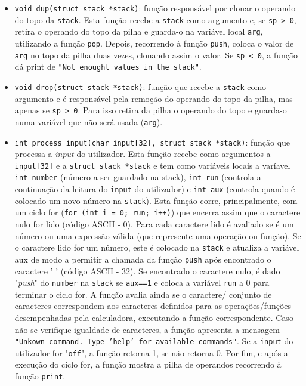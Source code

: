 \documentclass[12pt, a4paper]{article}
\begin{document}
\begin{itemize}
        \item \texttt{void dup(struct stack *stack)}: função responsável por clonar o operando do topo da \texttt{stack}. Esta função recebe a \texttt{stack} como argumento e, se \texttt{sp > 0}, retira o operando do topo da pilha e guarda-o na variável local \texttt{arg}, utilizando a função \texttt{pop}. Depois, recorrendo à função \texttt{push}, coloca o valor de \texttt{arg} no topo da pilha duas vezes, clonando assim o valor. Se \texttt{sp < 0}, a função dá print de \texttt{"Not enought values in the stack"}.
        
        \item \texttt{void drop(struct stack *stack)}: função que recebe a \texttt{stack} como argumento e é responsável pela remoção do operando do topo da pilha, mas apenas se \texttt{sp > 0}. Para isso retira da pilha o operando do topo e guarda-o numa variável que não será usada (\texttt{arg}).
        
        \item \texttt{int process\_input(char input[32], struct stack *stack)}: função que processa a \textit{input} do utilizador. Esta função recebe como argumentos a \texttt{input[32]} e a \texttt{struct stack *stack} e tem como variáveis locais a varíavel \texttt{int number} (número a ser guardado na stack), \texttt{int run} (controla a continuação da leitura do \texttt{input} do utilizador) e \texttt{int aux} (controla quando é colocado um novo número na \texttt{stack}). Esta função corre, principalmente, com um ciclo for (\texttt{for (int i = 0; run; i++)}) que encerra assim que o caractere nulo for lido (código ASCII - 0). Para cada caractere lido é avaliado se é um número ou uma expressão válida (que represente uma operação ou função). Se o caractere lido for um número, este é colocado na \texttt{stack} e atualiza a variável aux de modo a permitir a chamada da função \texttt{push} após encontrado o caractere ' ' (código ASCII - 32). Se encontrado o caractere nulo, é dado "\textit{push}" do \texttt{number} na \texttt{stack} se \texttt{aux==1} e coloca a variável \texttt{run} a 0 para terminar o ciclo for. A função avalia ainda se o caractere/ conjunto de caracteres correspondem aos caracteres definidos para as operações/funções desempenhadas pela calculadora, executando a função correspondente. Caso não se verifique igualdade de caracteres, a função apresenta a mensagem \texttt{"Unkown command. Type 'help' for available commands"}. Se a \texttt{input} do utilizador for "\texttt{off}", a função retorna 1, se não retorna 0. Por fim, e após a execução do ciclo for, a função mostra a pilha de operandos recorrendo à função \texttt{print}.
    \end{itemize}
    
\end{document}
